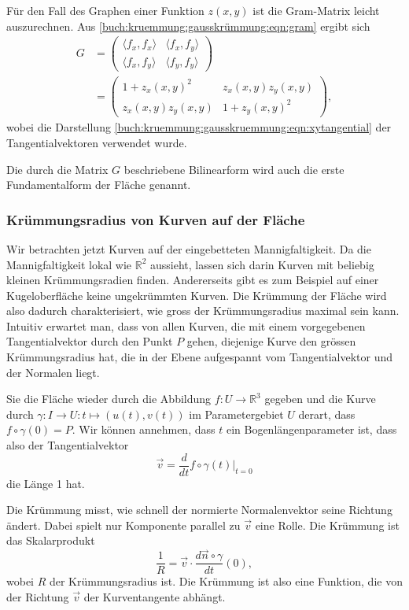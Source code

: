 \begin{beispiel}
\label{buch:kruemmung:flaeche:bsp:gram}
Für den Fall des Graphen einer Funktion $z(x,y)$ ist die Gram-Matrix
leicht auszurechnen.
Aus \eqref{buch:kruemmung:gausskrümmung:eqn:gram} ergibt sich
\begin{align*}
G
&=
\begin{pmatrix}
\langle f_x,f_x\rangle & \langle f_x,f_y\rangle \\
\langle f_x,f_y\rangle & \langle f_y,f_y\rangle
\end{pmatrix}
\\
&=
\begin{pmatrix}
1+z_x(x,y)^2 & z_x(x,y)z_y(x,y) \\
z_x(x,y) z_y(x,y) & 1 + z_y(x,y)^2
\end{pmatrix},
\end{align*}
wobei die Darstellung
\eqref{buch:kruemmung:gausskruemmung:eqn:xytangential}
der Tangentialvektoren verwendet wurde.
\end{beispiel}

Die durch die Matrix $G$ beschriebene Bilinearform wird auch die
erste Fundamentalform der Fläche genannt.

%
%
\subsubsection{Krümmungsradius von Kurven auf der Fläche}
Wir betrachten jetzt Kurven auf der eingebetteten Mannigfaltigkeit.
Da die Mannigfaltigkeit lokal wie $\mathbb{R}^2$ aussieht, lassen sich
darin Kurven mit beliebig kleinen Krümmungsradien finden.
Andererseits gibt es zum Beispiel auf einer Kugeloberfläche keine 
ungekrümmten Kurven.
Die Krümmung der Fläche wird also dadurch charakterisiert,
wie gross der Krümmungsradius maximal sein kann.
Intuitiv erwartet man, dass von allen Kurven, die mit einem vorgegebenen
Tangentialvektor durch den Punkt $P$ gehen, diejenige Kurve den grössen
Krümmungsradius hat, die in der Ebene aufgespannt vom Tangentialvektor
und der Normalen liegt.

Sie die Fläche wieder durch die Abbildung $f\colon U\to\mathbb{R}^3$
gegeben und die Kurve durch 
$\gamma\colon I\to U : t\mapsto(u(t),v(t))$ im
Parametergebiet $U$ derart, dass $f\circ\gamma(0)=P$.
Wir können annehmen, dass $t$ ein Bogenlängenparameter ist, dass
also der Tangentialvektor 
\[
\vec{v}
=
\frac{d}{dt} f\circ\gamma(t) 
\bigg|_{t=0}
\]
die Länge 1 hat.

Die Krümmung misst, wie schnell der normierte Normalenvektor seine
Richtung ändert.
Dabei spielt nur Komponente parallel zu $\vec{v}$ eine Rolle.
Die Krümmung ist das Skalarprodukt
\[
\frac{1}{R}
=
\vec{v} \cdot \frac{d\vec{n}\circ\gamma}{dt}(0),
\]
wobei $R$ der Krümmungsradius ist.
Die Krümmung ist also eine Funktion, die von der Richtung $\vec{v}$
der Kurventangente abhängt.

